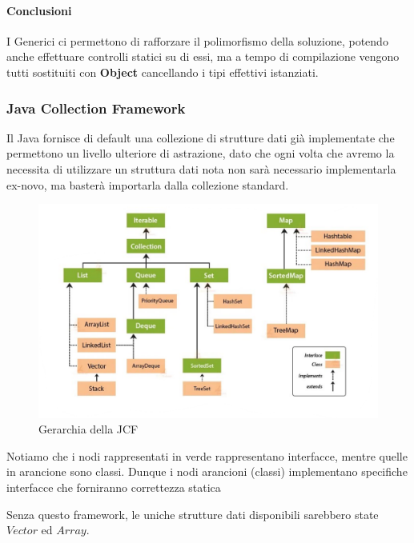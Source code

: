 \documentclass{article}
\begin{document}
\vspace*{15px}

\paragraph{Conclusioni} I Generici ci permettono di rafforzare il polimorfismo della soluzione, potendo anche effettuare controlli statici su di essi, ma a tempo di compilazione vengono tutti sostituiti con \textbf{Object} cancellando i tipi effettivi istanziati.

\newpage

\subsubsection{Java Collection Framework}

Il Java fornisce di default una collezione di strutture dati già implementate che permettono un livello ulteriore di astrazione, dato che ogni volta che avremo la necessita di utilizzare un struttura dati nota non sarà necessario implementarla ex-novo, ma basterà importarla dalla collezione standard.

\begin{figure}[htbp]
    \center
    \includegraphics[scale=0.5]{img/gerarchiaJavaCollection.png}
    \caption{Gerarchia della JCF}
\end{figure}

Notiamo che i nodi rappresentati in verde rappresentano interfacce, mentre quelle in arancione sono classi. Dunque i nodi arancioni (classi) implementano specifiche interfacce che forniranno correttezza statica

Senza questo framework, le uniche strutture dati disponibili sarebbero state $Vector$ ed $Array$.
\end{document}
